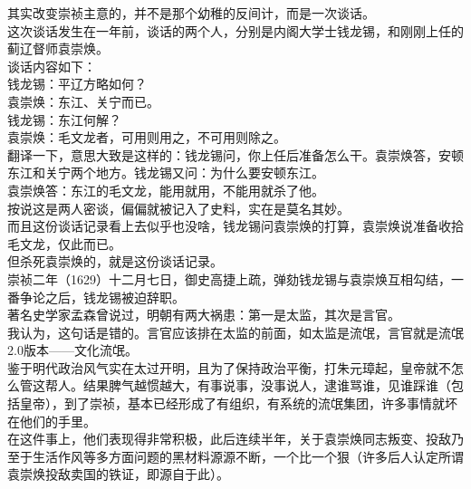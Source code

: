 \begin{multicols}{\theparacolNo}
其实改变崇祯主意的，并不是那个幼稚的反间计，而是一次谈话。\\

这次谈话发生在一年前，谈话的两个人，分别是内阁大学士钱龙锡，和刚刚上任的蓟辽督师袁崇焕。\\

谈话内容如下：\\

钱龙锡：平辽方略如何？\\

袁崇焕：东江、关宁而已。\\

钱龙锡：东江何解？\\

袁崇焕：毛文龙者，可用则用之，不可用则除之。\\

翻译一下，意思大致是这样的：钱龙锡问，你上任后准备怎么干。袁崇焕答，安顿东江和关宁两个地方。钱龙锡又问：为什么要安顿东江。\\

袁崇焕答：东江的毛文龙，能用就用，不能用就杀了他。\\

按说这是两人密谈，偏偏就被记入了史料，实在是莫名其妙。\\

而且这份谈话记录看上去似乎也没啥，钱龙锡问袁崇焕的打算，袁崇焕说准备收拾毛文龙，仅此而已。\\

但杀死袁崇焕的，就是这份谈话记录。\\

崇祯二年（1629）十二月七日，御史高捷上疏，弹劾钱龙锡与袁崇焕互相勾结，一番争论之后，钱龙锡被迫辞职。\\

著名史学家孟森曾说过，明朝有两大祸患：第一是太监，其次是言官。\\

我认为，这句话是错的。言官应该排在太监的前面，如太监是流氓，言官就是流氓2.0版本——文化流氓。\\

鉴于明代政治风气实在太过开明，且为了保持政治平衡，打朱元璋起，皇帝就不怎么管这帮人。结果脾气越惯越大，有事说事，没事说人，逮谁骂谁，见谁踩谁（包括皇帝），到了崇祯，基本已经形成了有组织，有系统的流氓集团，许多事情就坏在他们的手里。\\

在这件事上，他们表现得非常积极，此后连续半年，关于袁崇焕同志叛变、投敌乃至于生活作风等多方面问题的黑材料源源不断，一个比一个狠（许多后人认定所谓袁崇焕投敌卖国的铁证，即源自于此）。\\


\end{multicols}
